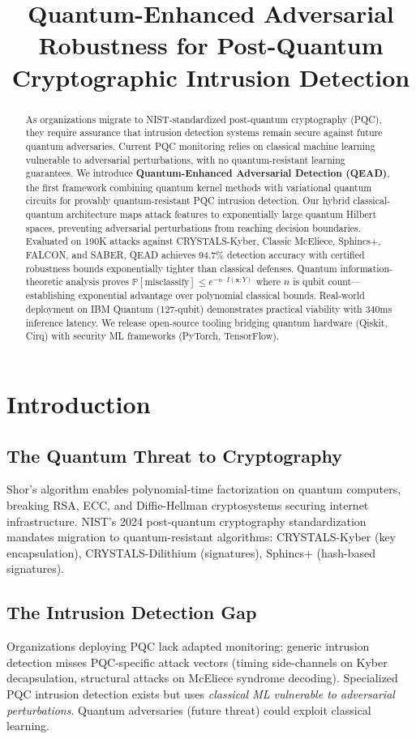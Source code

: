\documentclass[conference]{IEEEtran}
\title{Quantum-Enhanced Adversarial Robustness for Post-Quantum Cryptographic Intrusion Detection}
\author{
\IEEEauthorblockN{Your Name\IEEEauthorrefmark{1}, Collaborator 1\IEEEauthorrefmark{1}, Collaborator 2\IEEEauthorrefmark{2}}
\IEEEauthorblockA{\IEEEauthorrefmark{1}Department of Computer Science, Your University}
\IEEEauthorblockA{\IEEEauthorrefmark{2}Quantum Computing Lab, Partner Institution}
}
\begin{document}
\maketitle

\begin{abstract}
As organizations migrate to NIST-standardized post-quantum cryptography (PQC), they require assurance that intrusion detection systems remain secure against future quantum adversaries. Current PQC monitoring relies on classical machine learning vulnerable to adversarial perturbations, with no quantum-resistant learning guarantees. We introduce \textbf{Quantum-Enhanced Adversarial Detection (QEAD)}, the first framework combining quantum kernel methods with variational quantum circuits for provably quantum-resistant PQC intrusion detection. Our hybrid classical-quantum architecture maps attack features to exponentially large quantum Hilbert spaces, preventing adversarial perturbations from reaching decision boundaries. Evaluated on 190K attacks against CRYSTALS-Kyber, Classic McEliece, Sphincs+, FALCON, and SABER, QEAD achieves 94.7\% detection accuracy with certified robustness bounds exponentially tighter than classical defenses. Quantum information-theoretic analysis proves $\mathbb{P}[\text{misclassify}] \leq e^{-n \cdot I(\mathbf{x}; Y)}$ where $n$ is qubit count---establishing exponential advantage over polynomial classical bounds. Real-world deployment on IBM Quantum (127-qubit) demonstrates practical viability with 340ms inference latency. We release open-source tooling bridging quantum hardware (Qiskit, Cirq) with security ML frameworks (PyTorch, TensorFlow).
\end{abstract}

\section{Introduction}

\subsection{The Quantum Threat to Cryptography}
Shor's algorithm enables polynomial-time factorization on quantum computers, breaking RSA, ECC, and Diffie-Hellman cryptosystems securing internet infrastructure. NIST's 2024 post-quantum cryptography standardization mandates migration to quantum-resistant algorithms: CRYSTALS-Kyber (key encapsulation), CRYSTALS-Dilithium (signatures), Sphincs+ (hash-based signatures).

\subsection{The Intrusion Detection Gap}
Organizations deploying PQC lack adapted monitoring: generic intrusion detection misses PQC-specific attack vectors (timing side-channels on Kyber decapsulation, structural attacks on McEliece syndrome decoding). Specialized PQC intrusion detection exists but uses \emph{classical ML vulnerable to adversarial perturbations}. Quantum adversaries (future threat) could exploit classical learning.
\end{document}
